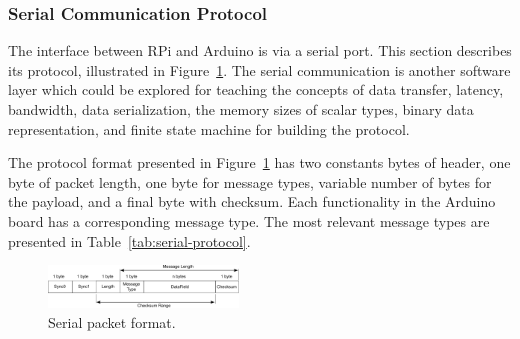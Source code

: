 
\subsubsection{Serial Communication Protocol}
\label{sec:serial}


The interface between RPi and Arduino is via a serial port. This section describes its protocol, illustrated in Figure~\ref{fig:serial-format}. The serial communication is another software layer which could be explored for teaching the concepts of data transfer, latency, bandwidth, data serialization, the memory sizes of scalar types, binary data representation, and finite state machine for building the protocol.

The protocol format presented in Figure~\ref{fig:serial-format} has two constants bytes of header, one byte of packet length, one byte for message types, variable number of bytes for the payload, and a final byte with checksum. Each functionality in the Arduino board has a corresponding message type. The most relevant message types are presented in Table~\ref{tab:serial-protocol}.

\begin{figure}[h!]
  \centering
    \includegraphics[width=0.45\textwidth]{figs/protocol.pdf}
  \caption{Serial packet format.}
  \label{fig:serial-format}
\end{figure}


